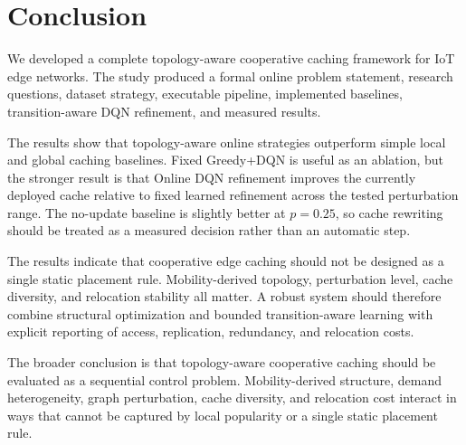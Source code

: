 \section{Conclusion}

We developed a complete topology-aware cooperative caching framework for IoT edge networks. The study produced a formal online problem statement, research questions, dataset strategy, executable pipeline, implemented baselines, transition-aware DQN refinement, and measured results.

The results show that topology-aware online strategies outperform simple local and global caching baselines. Fixed Greedy+DQN is useful as an ablation, but the stronger result is that Online DQN refinement improves the currently deployed cache relative to fixed learned refinement across the tested perturbation range. The no-update baseline is slightly better at \(p=0.25\), so cache rewriting should be treated as a measured decision rather than an automatic step.

The results indicate that cooperative edge caching should not be designed as a single static placement rule. Mobility-derived topology, perturbation level, cache diversity, and relocation stability all matter. A robust system should therefore combine structural optimization and bounded transition-aware learning with explicit reporting of access, replication, redundancy, and relocation costs.

The broader conclusion is that topology-aware cooperative caching should be evaluated as a sequential control problem. Mobility-derived structure, demand heterogeneity, graph perturbation, cache diversity, and relocation cost interact in ways that cannot be captured by local popularity or a single static placement rule.
